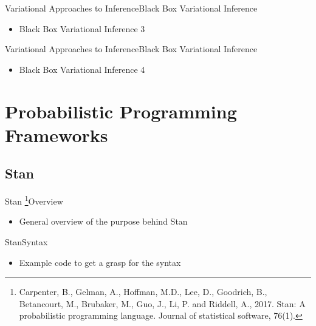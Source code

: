 \documentclass[AERbeamer%
              ,optEnglish%
              ,optBiber%
              ,optBibstyleAlphabetic%
              ,optBeamerClassicFormat%
              ]{AERlatex}%
\begin{document}
\begin{frame}[c]{Variational Approaches to Inference}{Black Box Variational Inference}
    \centering
    \begin{itemize}
        \item Black Box Variational Inference 3
    \end{itemize}
\end{frame}


\begin{frame}[c]{Variational Approaches to Inference}{Black Box Variational Inference}
    \centering
    \begin{itemize}
        \item Black Box Variational Inference 4
    \end{itemize}
\end{frame}




\section{Probabilistic Programming Frameworks}


\subsection{Stan}
\begin{frame}[c]{Stan \footnote{Carpenter, B., Gelman, A., Hoffman, M.D., Lee, D.,
                                Goodrich, B., Betancourt, M., Brubaker, M., Guo, J., Li, P.
                                and Riddell, A., 2017. Stan: A probabilistic programming
                                language. Journal of statistical software, 76(1).}}{Overview}
    \centering
    \begin{itemize}
        \item General overview of the purpose behind Stan
    \end{itemize}
\end{frame}


\begin{frame}[c]{Stan}{Syntax}
    \centering
    \begin{itemize}
        \item Example code to get a grasp for the syntax
    \end{itemize}
\end{frame}
\end{document}
